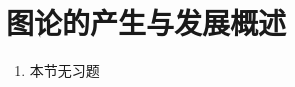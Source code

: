 \documentclass[../../main.tex]{subfiles}
\begin{document}
\section{图论的产生与发展概述}
\begin{enumerate}
\item 本节无习题
\end{enumerate}
\end{document}
